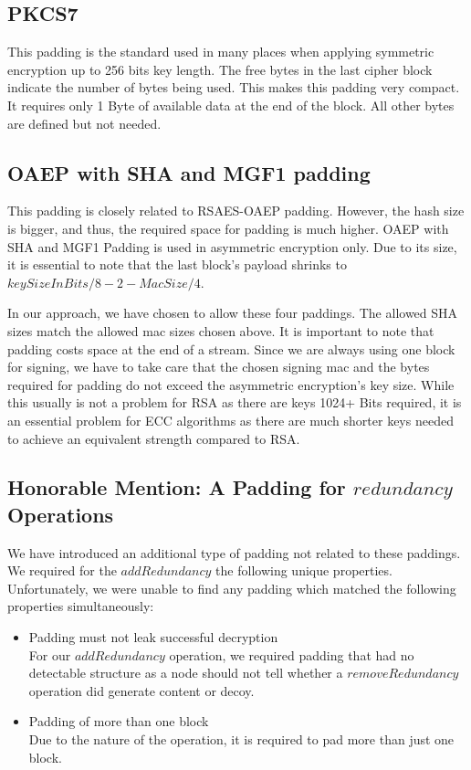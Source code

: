 \subsection{PKCS7} 
This padding is the standard used in many places when applying symmetric encryption up to 256 bits key length. The free bytes in the last cipher block indicate the number of bytes being used. This makes this padding very compact. It requires only 1 Byte of available data at the end of the block. All other bytes are defined but not needed.

\subsection{OAEP with SHA and MGF1 padding} 
This padding is closely related to RSAES-OAEP padding. However, the hash size is bigger, and thus, the required space for padding is much higher. OAEP with SHA and MGF1 Padding is used in asymmetric encryption only. Due to its size, it is essential to note that the last block's payload shrinks to $keySizeInBits/8-2-MacSize/4$.

In our approach, we have chosen to allow these four paddings. The allowed SHA sizes match the allowed mac sizes chosen above. It is important to note that padding costs space at the end of a stream. Since we are always using one block for signing, we have to take care that the chosen signing mac and the bytes required for padding do not exceed the asymmetric encryption's key size. While this usually is not a problem for RSA as there are keys 1024+ Bits required, it is an essential problem for ECC algorithms as there are much shorter keys needed to achieve an equivalent strength compared to RSA. 

\subsection{Honorable Mention: A Padding for \texorpdfstring{$redundancy$}{redundancy} Operations}
We have introduced an additional type of padding not related to these paddings. We required for the $addRedundancy$ the following unique properties. Unfortunately, we were unable to find any padding which matched the following properties simultaneously:

\begin{itemize}
	\item Padding must not leak successful decryption\\
	For our $addRedundancy$ operation, we required padding that had no detectable structure as a node should not tell whether a $removeRedundancy$ operation did generate content or decoy. 
	\item Padding of more than one block\\
	Due to the nature of the operation, it is required to pad more than just one block.
\end{itemize}

